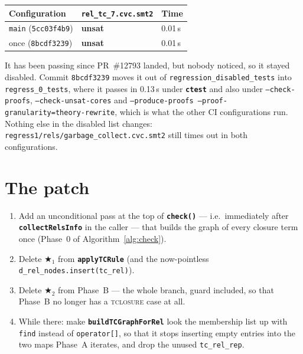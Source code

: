 \documentclass[11pt,a4paper]{article}
\newcommand{\code}[1]{\texttt{\small #1}}
\newcommand{\fn}[1]{\texttt{\small\bfseries #1}}
\theoremstyle{definition}
\begin{document}
\begin{center}\small
\begin{tabular}{@{}lll@{}}
\toprule
Configuration & \code{rel\_tc\_7.cvc.smt2} & Time\\
\midrule
\code{main} (\code{5cc03f4b9}) & \textbf{unsat} & 0.01\,s\\
once (\code{8bcdf3239})        & \textbf{unsat} & 0.01\,s\\
\bottomrule
\end{tabular}
\end{center}

\noindent
It has been passing since PR~\#12793 landed, but nobody noticed, so it stayed
disabled. Commit \code{8bcdf3239} moves it out of
\code{regression\_disabled\_tests} into \code{regress\_0\_tests}, where it passes
in 0.13\,s under \fn{ctest} and also under \code{--check-proofs},
\code{--check-unsat-cores} and \code{--produce-proofs
--proof-granularity=theory-rewrite}, which is what the other CI configurations
run. Nothing else in the disabled list changes:
\code{regress1/rels/garbage\_collect.cvc.smt2} still times out in both
configurations.

\section{The patch}

\begin{enumerate}[leftmargin=*,itemsep=1pt]
\item Add an unconditional pass at the top of \fn{check()} --- i.e.\ immediately
  after \fn{collectRelsInfo} in the caller --- that builds the graph of every
  closure term once (Phase~0 of Algorithm~\ref{alg:check}).
\item Delete $\bigstar_1$ from \fn{applyTCRule} (and the now-pointless
  \code{d\_rel\_nodes.insert(tc\_rel)}).
\item Delete $\bigstar_2$ from Phase~B --- the whole branch, guard included, so
  that Phase~B no longer has a \textsc{tclosure} case at all.
\item While there: make \fn{buildTCGraphForRel} look the membership list up
  with \code{find} instead of \code{operator[]}, so that it stops inserting
  empty entries into the two maps Phase~A iterates, and drop the unused
  \code{tc\_rel\_rep}.
\end{enumerate}
\end{document}
